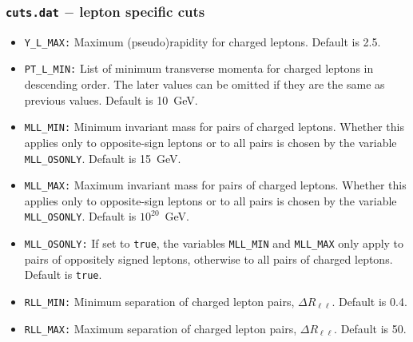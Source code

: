 \documentclass[english,12pt]{article}
\begin{document}
\subsubsection{{\tt cuts.dat} $-$ lepton specific cuts}

\begin{itemize}
\item {\tt Y\_L\_MAX:} Maximum (pseudo)rapidity for charged leptons. Default is 2.5.
\item {\tt PT\_L\_MIN:} List of minimum transverse momenta for charged leptons
in descending order. The later values can be omitted if they are the same as
previous values. Default is 10~GeV.
\item {\tt MLL\_MIN:} Minimum invariant mass for pairs of charged
  leptons. Whether this applies only to opposite-sign leptons or to all
  pairs is chosen by the variable {\tt MLL\_OSONLY}.
  Default is 15~GeV.
\item {\tt MLL\_MAX:} Maximum invariant mass for pairs of
  charged leptons. Whether this applies only to opposite-sign leptons or to all
  pairs is chosen by the variable {\tt MLL\_OSONLY}.
  Default is $10^{20}$~GeV.
\item {\tt MLL\_OSONLY:} If set to {\tt true}, the variables 
  {\tt MLL\_MIN} and {\tt MLL\_MAX} only apply to pairs of oppositely
  signed leptons, otherwise to all pairs of charged leptons. 
  Default is {\tt true}.
\item {\tt RLL\_MIN:} Minimum separation of charged lepton pairs, $\Delta R_{\ell\ell}$. 
Default is 0.4.
\item {\tt RLL\_MAX:} Maximum separation of  charged lepton pairs, $\Delta R_{\ell\ell}$. 
Default is 50.
\end{itemize}
\end{document}
